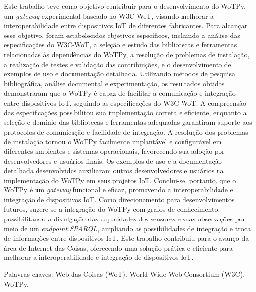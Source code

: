 \begin{resumo}
Este trabalho teve como objetivo contribuir para o desenvolvimento do WoTPy, um \textit{gateway} experimental baseado no W3C-WoT, visando melhorar a interoperabilidade entre dispositivos IoT de diferentes fabricantes. Para alcançar esse objetivo, foram estabelecidos objetivos específicos, incluindo a análise das especificações do W3C-WoT, a seleção e estudo das bibliotecas e ferramentas relacionadas às dependências do WoTPy, a resolução de problemas de instalação, a realização de testes e validação das contribuições, e o desenvolvimento de exemplos de uso e documentação detalhada. Utilizando métodos de pesquisa bibliográfica, análise documental e experimentação, os resultados obtidos demonstraram que o WoTPy é capaz de facilitar a comunicação e integração entre dispositivos IoT, seguindo as especificações do W3C-WoT. A compreensão das especificações possibilitou sua implementação correta e eficiente, enquanto a seleção e domínio das bibliotecas e ferramentas adequadas garantiram suporte aos protocolos de comunicação e facilidade de integração. A resolução dos problemas de instalação tornou o WoTPy facilmente implantável e configurável em diferentes ambientes e sistemas operacionais, favorecendo sua adoção por desenvolvedores e usuários finais. Os exemplos de uso e a documentação detalhada desenvolvidos auxiliaram outros desenvolvedores e usuários na implementação do WoTPy em seus projetos IoT. Conclui-se, portanto, que o WoTPy é um \textit{gateway} funcional e eficaz, promovendo a interoperabilidade e integração de dispositivos IoT. Como direcionamento para desenvolvimentos futuros, sugere-se a integração do WoTPy com grafos de conhecimento, possibilitando a divulgação das capacidades dos sensores e suas observações por meio de um \textit{endpoint SPARQL}, ampliando as possibilidades de integração e troca de informações entre dispositivos IoT. Este trabalho contribuiu para o avanço da área de Internet das Coisas, oferecendo uma solução prática e eficiente para melhorar a interoperabilidade e integração de dispositivos IoT.

Palavras-chaves: Web das Coisas (WoT). World Wide Web Consortium (W3C). WoTPy.
\end{resumo}


